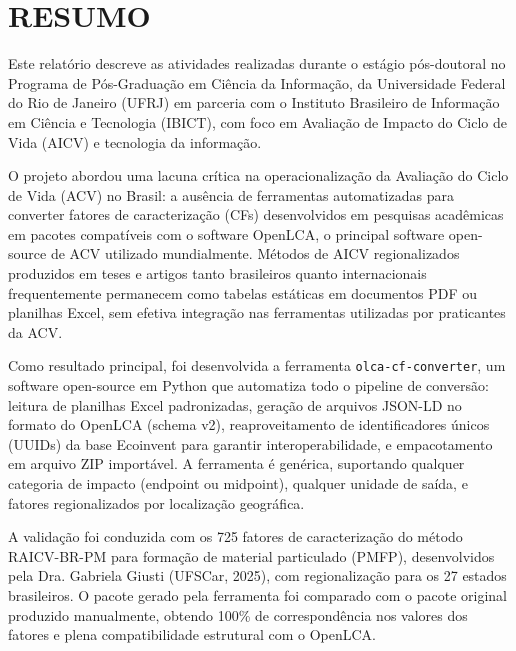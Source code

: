 
\section*{RESUMO}

Este relat\'orio descreve as atividades realizadas durante o est\'agio p\'os-doutoral no Programa de Pós-Graduação em Ciência da Informação, da Universidade Federal do Rio de Janeiro (UFRJ) em parceria com o Instituto Brasileiro de Informação em Ciência e Tecnologia (IBICT), com foco em Avalia\c{c}\~ao de Impacto do Ciclo de Vida (AICV) e tecnologia da informação.

O projeto abordou uma lacuna cr\'itica na operacionaliza\c{c}\~ao da Avalia\c{c}\~ao do Ciclo de Vida (ACV) no Brasil: a aus\^encia de ferramentas automatizadas para converter fatores de caracteriza\c{c}\~ao (CFs) desenvolvidos em pesquisas acad\^emicas em pacotes compat\'iveis com o software OpenLCA, o principal software open-source de ACV utilizado mundialmente. M\'etodos de AICV regionalizados produzidos em teses e artigos tanto brasileiros quanto internacionais frequentemente permanecem como tabelas est\'aticas em documentos PDF ou planilhas Excel, sem efetiva integra\c{c}\~ao nas ferramentas utilizadas por praticantes da ACV.

Como resultado principal, foi desenvolvida a ferramenta \texttt{olca-cf-converter}, um software open-source em Python que automatiza todo o pipeline de convers\~ao: leitura de planilhas Excel padronizadas, gera\c{c}\~ao de arquivos JSON-LD no formato do OpenLCA (schema v2), reaproveitamento de identificadores \'unicos (UUIDs) da base Ecoinvent para garantir interoperabilidade, e empacotamento em arquivo ZIP import\'avel. A ferramenta \'e gen\'erica, suportando qualquer categoria de impacto (endpoint ou midpoint), qualquer unidade de sa\'ida, e fatores regionalizados por localiza\c{c}\~ao geogr\'afica.

A valida\c{c}\~ao foi conduzida com os 725 fatores de caracteriza\c{c}\~ao do m\'etodo RAICV-BR-PM para forma\c{c}\~ao de material particulado (PMFP), desenvolvidos pela Dra. Gabriela Giusti (UFSCar, 2025), com regionaliza\c{c}\~ao para os 27 estados brasileiros. O pacote gerado pela ferramenta foi comparado com o pacote original produzido manualmente, obtendo 100\% de correspond\^encia nos valores dos fatores e plena compatibilidade estrutural com o OpenLCA.

